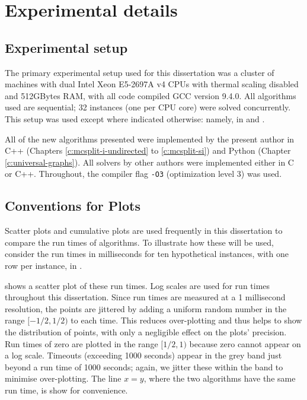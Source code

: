 \section{Experimental details}\label{sec:experimental-details}

\subsection{Experimental setup}

The primary experimental setup used for this dissertation was a cluster
of machines with dual Intel Xeon E5-2697A v4 CPUs with thermal scaling disabled
and 512GBytes RAM, with all code compiled GCC version 9.4.0.
All algorithms used are sequential; 32 instances
(one per CPU core) were solved concurrently.
This setup was used except where indicated otherwise: namely, in
 and .

All of the new algorithms presented were implemented by the present author in
C++ (Chapters \ref{c:mcsplit-i-undirected} to \ref{c:mcsplit-si})
and Python (Chapter \ref{c:universal-graphs}).  All solvers by other
authors were implemented either in C or C++.  Throughout, the 
compiler flag \texttt{-O3} (optimization level 3) was used.

\subsection{Conventions for Plots}

Scatter plots and cumulative plots are used frequently in this dissertation to
compare the run times of algorithms.  To illustrate how these will be used,
consider the run times in milliseconds for ten hypothetical instances,
with one row per instance, in .

 shows a scatter plot of these run times. Log
scales are used for run times throughout this dissertation. Since run times are
measured at a 1 millisecond resolution, the points are jittered by adding a
uniform random number in the range $[-1/2,1/2)$ to each time. This reduces
over-plotting and thus helps to show the distribution of points, with only a
negligible effect on the plots' precision. Run times of zero are plotted in the
range $[1/2,1)$ because zero cannot appear on a log scale.  Timeouts (exceeding
1000 seconds) appear in the grey band just beyond a run time of 1000 seconds;
again, we jitter these within the band to minimise over-plotting. The line
$x=y$, where the two algorithms have the same run time, is show for
convenience.

